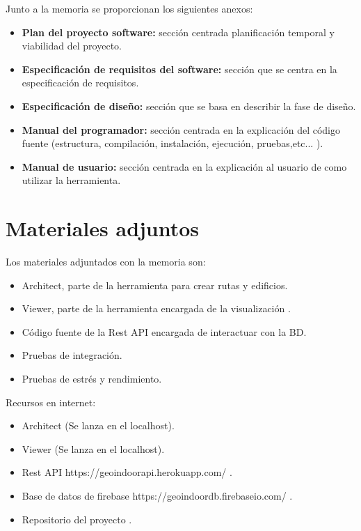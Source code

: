 Junto a la memoria se proporcionan los siguientes anexos:

\begin{itemize}
\tightlist
\item
  \textbf{Plan del proyecto software:} sección centrada planificación temporal y viabilidad del proyecto.
\item
  \textbf{Especificación de requisitos del software:} sección que se centra en la especificación de requisitos.
\item
  \textbf{Especificación de diseño:} sección que se basa en describir la fase de diseño.
\item
  \textbf{Manual del programador:} sección centrada en la explicación del código fuente (estructura, compilación,
  instalación, ejecución, pruebas,etc... ).
\item
  \textbf{Manual de usuario:} sección centrada en la explicación al usuario de como utilizar la herramienta.
\end{itemize}

\section{Materiales adjuntos}\label{materiales-adjuntos}

Los materiales adjuntados con la memoria son: 

\begin{itemize}
\tightlist
\item
	Architect, parte de la herramienta para crear rutas y edificios.
\item
	Viewer, parte de la herramienta encargada de la visualización .
\item	
	Código fuente de la Rest API encargada de interactuar con la BD.
\item	
	Pruebas de integración.
\item	
	Pruebas de estrés y rendimiento.
\end{itemize}

Recursos en internet:

\begin{itemize}
\tightlist
\item
  Architect (Se lanza en el localhost).
\item
  Viewer (Se lanza en el localhost).
\item
  Rest API https://geoindoorapi.herokuapp.com/ .
\item
  Base de datos de firebase  https://geoindoordb.firebaseio.com/ .
\item
  Repositorio del proyecto .
\end{itemize}
